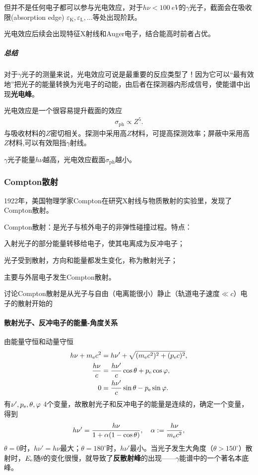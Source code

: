 但并不是任何电子都可以参与光电效应，对于$h\nu<\SI{100}{eV}$的$\gamma$光子，截面会在吸收限(absorption edge) $\varepsilon_\mathrm K,\varepsilon_\mathrm L,\ldots$等处出现阶跃。

光电效应后续会出现特征X射线和Auger电子，结合能高时前者占优。

\subparagraph{总结}
对于$\gamma$光子的测量来说，光电效应可说是最重要的反应类型了！因为它可以“最有效地”把光子的能量转换为光电子的动能，由后者在探测器内形成信号，使能谱中出现\textbf{光电峰}。

光电效应是一个很容易提升截面的效应
\begin{align}
	\sigma_{\mathrm{ph}}\propto Z^5.
\end{align}
与吸收材料的$Z$密切相关。探测中采用高$Z$材料，可提高探测效率；屏蔽中采用高$Z$材料,可以有效阻挡$\gamma$射线。

$\gamma$光子能量$h\nu$越高，光电效应截面$\sigma_{\mathrm{ph}}$越小。
\subsubsection{Compton散射}
1922年，美国物理学家Compton在研究X射线与物质散射的实验里，发现了Compton散射。

Compton散射：是光子与核外电子的非弹性碰撞过程。特点：
\begin{compactenum}
	\item 入射光子的部分能量转移给电子，使其电离成为反冲电子；
	\item 光子受到散射，方向和能量都发生变化，称为散射光子；
	\item 主要与外层电子发生Compton散射。
\end{compactenum}
讨论Compton散射是从光子与自由（电离能很小）静止（轨道电子速度$\ll c$）电子的散射开始的
\paragraph{散射光子、反冲电子的能量-角度关系}由能量守恒和动量守恒
\begin{align*}
	h\nu+m_\mathrm e c^2&=h\nu'+\sqrt{(m_\mathrm e c^2)^2+(p_\mathrm e c)^2},\\
	\frac{h\nu}c&=\frac{h\nu'}c\cos\theta+p_\mathrm e\cos\varphi,\\
	0&=\frac{h\nu'}c\sin\theta-p_\mathrm e\sin\varphi.
\end{align*}
有$\nu',p_\mathrm e,\theta,\varphi$ 4个变量，故散射光子和反冲电子的能量是连续的，确定一个变量，得到
\begin{align}\label{Compton-hnu}
	h\nu'=\frac{h\nu}{1+\alpha(1-\cos\theta)},\quad \alpha:=\frac{h\nu}{m_\mathrm e c^2},
\end{align}
$\theta=0$时，$h\nu'=h\nu$最大；$\theta=180^\circ$时，$h\nu'$最小。当光子发生大角度（$\theta>150^\circ$）散射时，$E_\mathrm e$随$\theta$的变化很慢，就导致了\textbf{反散射峰}的出现——$\gamma$能谱中的一个著名本底峰。

